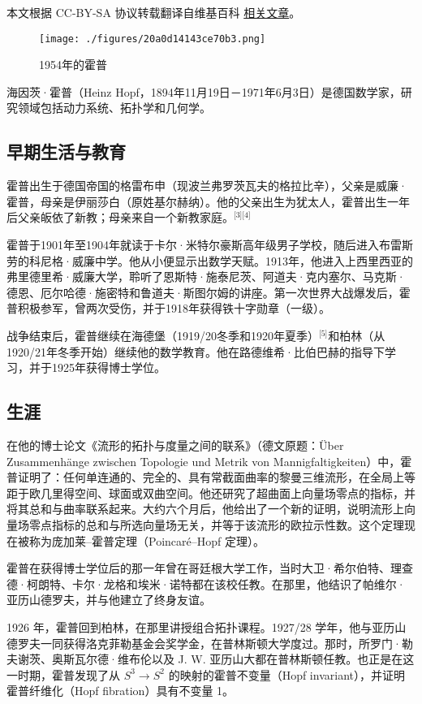 
本文根据 CC-BY-SA 协议转载翻译自维基百科 \href{https://en.wikipedia.org/wiki/Heinz_Hopf}{相关文章}。

\begin{figure}[ht]
\centering
\texttt{[image: ./figures/20a0d14143ce70b3.png]}
\caption{1954年的霍普} \label{fig_HYCH_1}
\end{figure}
海因茨·霍普（Heinz Hopf，1894年11月19日－1971年6月3日）是德国数学家，研究领域包括动力系统、拓扑学和几何学。
\subsection{早期生活与教育}
霍普出生于德国帝国的格雷布申（现波兰弗罗茨瓦夫的格拉比辛），父亲是威廉·霍普，母亲是伊丽莎白（原姓基尔赫纳）。他的父亲出生为犹太人，霍普出生一年后父亲皈依了新教；母亲来自一个新教家庭。\(^\text{[3][4]}\)

霍普于1901年至1904年就读于卡尔·米特尔豪斯高年级男子学校，随后进入布雷斯劳的科尼格·威廉中学。他从小便显示出数学天赋。1913年，他进入上西里西亚的弗里德里希·威廉大学，聆听了恩斯特·施泰尼茨、阿道夫·克内塞尔、马克斯·德恩、厄尔哈德·施密特和鲁道夫·斯图尔姆的讲座。第一次世界大战爆发后，霍普积极参军，曾两次受伤，并于1918年获得铁十字勋章（一级）。

战争结束后，霍普继续在海德堡（1919/20冬季和1920年夏季）\(^\text{[5]}\)和柏林（从1920/21年冬季开始）继续他的数学教育。他在路德维希·比伯巴赫的指导下学习，并于1925年获得博士学位。
\subsection{生涯}
在他的博士论文《流形的拓扑与度量之间的联系》（德文原题：Über Zusammenhänge zwischen Topologie und Metrik von Mannigfaltigkeiten）中，霍普证明了：任何单连通的、完全的、具有常截面曲率的黎曼三维流形，在全局上等距于欧几里得空间、球面或双曲空间。他还研究了超曲面上向量场零点的指标，并将其总和与曲率联系起来。大约六个月后，他给出了一个新的证明，说明流形上向量场零点指标的总和与所选向量场无关，并等于该流形的欧拉示性数。这个定理现在被称为庞加莱–霍普定理（Poincaré–Hopf 定理）。

霍普在获得博士学位后的那一年曾在哥廷根大学工作，当时大卫·希尔伯特、理查德·柯朗特、卡尔·龙格和埃米·诺特都在该校任教。在那里，他结识了帕维尔·亚历山德罗夫，并与他建立了终身友谊。

1926 年，霍普回到柏林，在那里讲授组合拓扑课程。1927/28 学年，他与亚历山德罗夫一同获得洛克菲勒基金会奖学金，在普林斯顿大学度过。那时，所罗门·勒夫谢茨、奥斯瓦尔德·维布伦以及 J. W. 亚历山大都在普林斯顿任教。也正是在这一时期，霍普发现了从
$S^3 \to S^2$ 的映射的霍普不变量（Hopf invariant），并证明霍普纤维化（Hopf fibration）具有不变量 1。

